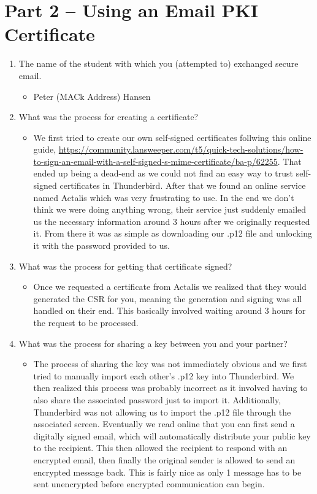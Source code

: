 \documentclass[11pt]{article}
\begin{document}
\section{Part 2 -- Using an Email PKI Certificate}
\label{sec:orgdc4fb58}
\begin{enumerate}
\item The name of the student with which you (attempted to) exchanged secure email.
\begin{itemize}
\item Peter (MACk Address) Hansen
\end{itemize}
\item What was the process for creating a certificate?
\begin{itemize}
\item We first tried to create our own self-signed certificates follwing this online guide, \url{https://community.lansweeper.com/t5/quick-tech-solutions/how-to-sign-an-email-with-a-self-signed-s-mime-certificate/ba-p/62255}. That ended up being a dead-end as we could not find an easy way to trust self-signed certificates in Thunderbird. After that we found an online service named Actalis which was very frustrating to use. In the end we don't think we were doing anything wrong, their service just suddenly emailed us the necessary information around 3 hours after we originally requested it. From there it was as simple as downloading our .p12 file and unlocking it with the password provided to us.
\end{itemize}
\item What was the process for getting that certificate signed?
\begin{itemize}
\item Once we requested a certificate from Actalis we realized that they would generated the CSR for you, meaning the generation and signing was all handled on their end. This basically involved waiting around 3 hours for the request to be processed.
\end{itemize}
\item What was the process for sharing a key between you and your partner?
\begin{itemize}
\item The process of sharing the key was not immediately obvious and we first tried to manually import each other's .p12 key into Thunderbird. We then realized this process was probably incorrect as it involved having to also share the associated password just to import it. Additionally, Thunderbird was not allowing us to import the .p12 file through the associated screen. Eventually we read online that you can first send a digitally signed email, which will automatically distribute your public key to the recipient. This then allowed the recipient to respond with an encrypted email, then finally the original sender is allowed to send an encrypted message back. This is fairly nice as only 1 message has to be sent unencrypted before encrypted communication can begin.

\end{itemize}
\end{enumerate}
\end{document}
